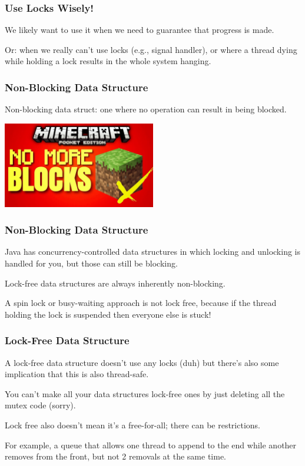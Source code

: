 \begin{frame}
\frametitle{Use Locks Wisely!}


We likely want to use it when we need to guarantee that progress is made. 

Or: when we really can't use locks (e.g., signal handler), or where a thread dying while holding a lock results in the whole system hanging.

\end{frame}

\begin{frame}
\frametitle{Non-Blocking Data Structure}

Non-blocking data struct: one where no operation can result in being blocked. 


\begin{center}
	\includegraphics[width=0.5\textwidth]{images/noblocks.jpg}
\end{center}


\end{frame}

\begin{frame}
\frametitle{Non-Blocking Data Structure}

Java has concurrency-controlled data structures in which locking and unlocking is handled for you, but those can still be blocking. 

Lock-free data structures are always inherently non-blocking. 

A spin lock or busy-waiting approach is not lock free, because if the thread holding the lock is suspended then everyone else is stuck!

\end{frame}

\begin{frame}
\frametitle{Lock-Free Data Structure}
A lock-free data structure doesn't use any locks (duh) but there's also some implication that this is also thread-safe.

You can't make all your data structures lock-free ones by just deleting all the mutex code (sorry). 

Lock free also doesn't mean it's a free-for-all; there can be restrictions. 

For example, a queue that allows one thread to append to the end while another removes from the front, but not 2 removals at the same time.
\end{frame}




